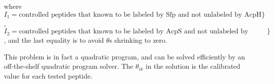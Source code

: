 where $I_1 = \text{controlled peptides that known to be labeled by Sfp and not unlabeled by AcpH}\}$, $I_2 = \text{controlled peptides that known to be labeled by AcpS and not unlabeled by AcpH}\}$, and the last equality is to avoid $\theta$s shrinking to zero.

This problem is in fact a quadratic program, and can be solved efficiently by an off-the-shelf quadratic program solver. The $\theta_{ik}$ in the solution is the calibrated
value for each tested peptide.

